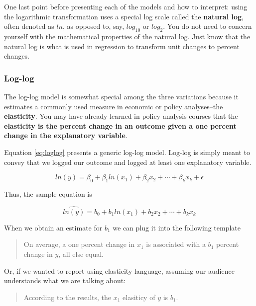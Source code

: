 \documentclass[
]{book}
\begin{document}
One last point before presenting each of the models and how to interpret: using the logarithmic transformation uses a special log scale called the \textbf{natural log}, often denoted as \textbf{\(ln\)}, as opposed to, say, \(log_{10}\) or \(log_2\). You do not need to concern yourself with the mathematical properties of the natural log. Just know that the natural log is what is used in regression to transform unit changes to percent changes.

\hypertarget{log-log}{%
\subsubsection*{Log-log}\label{log-log}}

The log-log model is somewhat special among the three variations because it estimates a commonly used measure in economic or policy analyses--the \textbf{elasticity}. You may have already learned in policy analysis courses that the \textbf{elasticity is the percent change in an outcome given a one percent change in the explanatory variable}.

Equation \eqref{eq:loglog} presents a generic log-log model. Log-log is simply meant to convey that we logged our outcome and logged at least one explanatory variable.

\begin{equation}
ln(y)=\beta_0 + \beta_1ln(x_1) + \beta_2x_2 + \cdots + \beta_kx_k + \epsilon
\label{eq:loglog}
\end{equation}

Thus, the sample equation is

\begin{equation}
\hat{ln(y)}=b_0 + b_1ln(x_1) + b_2x_2 + \cdots + b_kx_k
\label{eq:loglogsamp}
\end{equation}

When we obtain an estimate for \(b_1\) we can plug it into the following template

\begin{quote}
On average, a one percent change in \(x_1\) is associated with a \(b_1\) percent change in \(y\), all else equal.
\end{quote}

Or, if we wanted to report using elasticity language, assuming our audience understands what we are talking about:

\begin{quote}
According to the results, the \(x_1\) elasiticy of \(y\) is \(b_1\).
\end{quote}
\end{document}
